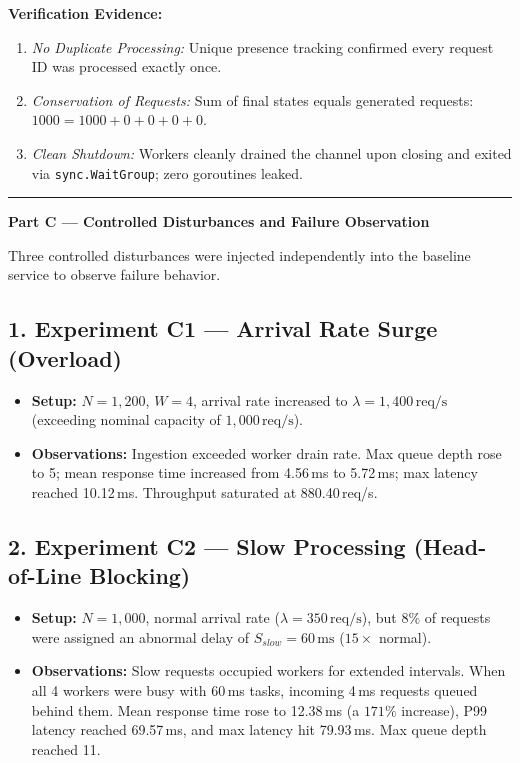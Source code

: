 \documentclass[11pt]{article}
\begin{document}
\noindent\textbf{Verification Evidence:}
\begin{enumerate}[itemsep=0.1em]
    \item \textit{No Duplicate Processing:} Unique presence tracking confirmed every request ID was processed exactly once.
    \item \textit{Conservation of Requests:} Sum of final states equals generated requests: $1000 = 1000 + 0 + 0 + 0 + 0$.
    \item \textit{Clean Shutdown:} Workers cleanly drained the channel upon closing and exited via \texttt{sync.WaitGroup}; zero goroutines leaked.
\end{enumerate}

\vspace{1.5em}\hrule\vspace{1.2em}

\newpage
{\centering\fontsize{14}{17}\selectfont\textbf{Part C --- Controlled Disturbances and Failure Observation}\par}
\vspace{0.6em}

Three controlled disturbances were injected independently into the baseline service to observe failure behavior.

\subsection*{1. Experiment C1 --- Arrival Rate Surge (Overload)}
\begin{itemize}[itemsep=0.1em]
    \item \textbf{Setup:} $N = 1,200$, $W = 4$, arrival rate increased to $\lambda = 1,400\,\text{req/s}$ (exceeding nominal capacity of $1,000\,\text{req/s}$).
    \item \textbf{Observations:} Ingestion exceeded worker drain rate. Max queue depth rose to 5; mean response time increased from 4.56\,ms to 5.72\,ms; max latency reached 10.12\,ms. Throughput saturated at 880.40\,req/s.
\end{itemize}

\subsection*{2. Experiment C2 --- Slow Processing (Head-of-Line Blocking)}
\begin{itemize}[itemsep=0.1em]
    \item \textbf{Setup:} $N = 1,000$, normal arrival rate ($\lambda = 350\,\text{req/s}$), but $8\%$ of requests were assigned an abnormal delay of $S_{slow} = 60\,\text{ms}$ ($15\times$ normal).
    \item \textbf{Observations:} Slow requests occupied workers for extended intervals. When all 4 workers were busy with 60\,ms tasks, incoming 4\,ms requests queued behind them. Mean response time rose to 12.38\,ms (a $171\%$ increase), P99 latency reached 69.57\,ms, and max latency hit 79.93\,ms. Max queue depth reached 11.
\end{itemize}
\end{document}
